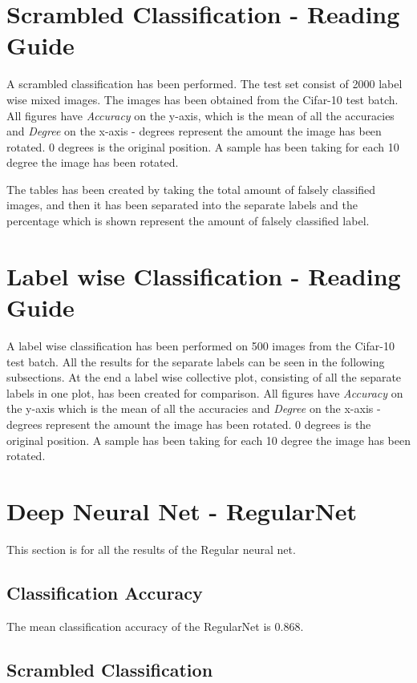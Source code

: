 \section{Scrambled Classification - Reading Guide}
A scrambled classification has been performed. The test set consist of 2000 label wise mixed images. The images has been obtained from the Cifar-10 test batch.
All figures have \emph{Accuracy} on the y-axis, which is the mean of all the accuracies and \emph{Degree} on the x-axis - degrees represent the amount the image has been rotated. 0 degrees is the original position. A sample has been taking for each 10 degree the image has been rotated.

The tables has been created by taking the total amount of falsely classified images, and then it has been separated into the separate labels and the percentage which is shown represent the amount of falsely classified label.

\section{Label wise Classification - Reading Guide}
A label wise classification has been performed on 500 images from the Cifar-10 test batch. All the results for the separate labels can be seen in the following subsections. At the end a label wise collective plot, consisting of all the separate labels in one plot, has been created for comparison.
All figures have \emph{Accuracy} on the y-axis which is the mean of all the accuracies and \emph{Degree} on the x-axis - degrees represent the amount the image has been rotated. 0 degrees is the original position. A sample has been taking for each 10 degree the image has been rotated.

\section{Deep Neural Net - RegularNet}
This section is for all the results of the Regular neural net.

\subsection{Classification Accuracy}
The mean classification accuracy of the RegularNet is 0.868.
\FloatBarrier
\subsection{Scrambled Classification}
\FloatBarrier

